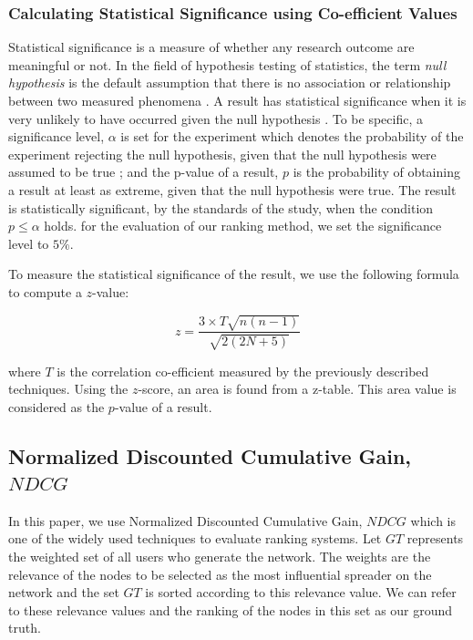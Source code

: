 \documentclass[sigconf]{acmart}
\begin{document}
\subsubsection{Calculating Statistical Significance using Co-efficient Values}
Statistical significance is a measure of whether any research outcome are meaningful or not. In the field of hypothesis testing of statistics, the term \textit{null hypothesis} is the default assumption that there is no association or relationship between two measured phenomena \cite{DictionaryofStatistics}. A result has statistical significance when it is very unlikely to have occurred given the null hypothesis \cite{myers2010developing}. To be specific, a significance level, $\alpha$ is set for the experiment which denotes the probability of the experiment rejecting the null hypothesis, given that the null hypothesis were assumed to be true \cite{dalgaard2011}; and the p-value of a result, $p$ is the probability of obtaining a result at least as extreme, given that the null hypothesis were true. The result is statistically significant, by the standards of the study, when the condition $p \leq \alpha$ holds\cite{johnson2013revised,redmond2001biostatistics,cumming2013understanding,krzywinski2013points,devore2011probability}.
for the evaluation of our ranking method, we set the significance level to $5\%$.

To measure the statistical significance of the result, we use the following formula to compute a $z$-value:

\begin{equation}
z = \dfrac{3 \times T \sqrt{n(n-1)}}{\sqrt{2(2N+5)}}
\end{equation}

where $T$ is the correlation co-efficient measured by the previously described techniques. Using the $z$-score, an area is found from a z-table. This area value is considered as the $p$-value of a result.


\subsection{Normalized Discounted Cumulative Gain, $NDCG$}
In this paper, we use Normalized Discounted Cumulative Gain, $NDCG$ which is one of the widely used techniques to evaluate ranking systems. Let $GT$ represents the weighted set of all users who generate the network. The weights are the relevance of the nodes to be selected as the most influential spreader on the network and the set $GT$ is sorted according to this relevance value. We can refer to these relevance values and the ranking of the nodes in this set as our ground truth.
\end{document}
